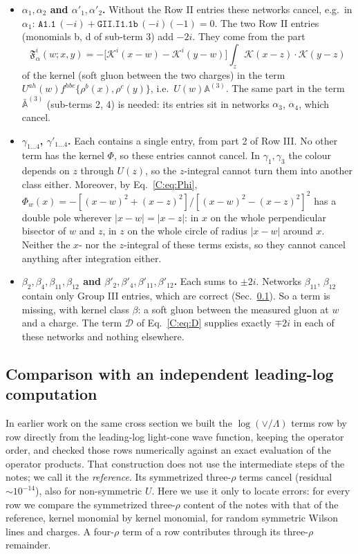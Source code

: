\documentclass[10pt]{article}
\numberwithin{equation}{section}
\newcommand{\KK}{\mathcal K}
\newcommand{\lab}[1]{\texttt{#1}}
\begin{document}
\begin{itemize}
\item \textbf{$\alpha_1,\alpha_2$ and $\alpha'_1,\alpha'_2$.} Without the Row II entries these networks cancel, e.g.\ in $\alpha_1$: $\lab{A1.1}\,(-i)+\lab{GII.I1.1b}\,(-i)(-1)=0$. The two Row II entries (monomials b, d of sub-term 3) add $-2i$. They come from the part
\begin{equation}
\mathfrak F^i_\alpha(w;x,y)=-\big[\KK^i(x-w)-\KK^i(y-w)\big]\int_z\KK(x-z)\cdot\KK(y-z)
\label{C:eq:Falpha}
\end{equation}
of the kernel (soft gluon between the two charges) in the term $U^{ah}(w)f^{hbc}\{\rho^b(x),\rho^c(y)\}$, i.e.\ $U(w)\mathbb A^{(3)}$. The same part in the term $\bar{\mathbb A}^{(3)}$ (sub-terms 2, 4) is needed: its entries sit in networks $\alpha_3$, $\alpha_4$, which cancel.
\item \textbf{$\gamma_{1\ldots4}$, $\gamma'_{1\ldots4}$.} Each contains a single entry, from part 2 of Row III. No other term has the kernel $\Phi$, so these entries cannot cancel. In $\gamma_1,\gamma_3$ the colour depends on $z$ through $U(z)$, so the $z$-integral cannot turn them into another class either. Moreover, by Eq.~\eqref{C:eq:Phi}, $\Phi_w(x)=-[(x-w)^2+(x-z)^2]/[(x-w)^2-(x-z)^2]^2$ has a double pole wherever $|x-w|=|x-z|$: in $x$ on the whole perpendicular bisector of $w$ and $z$, in $z$ on the whole circle of radius $|x-w|$ around $x$. Neither the $x$- nor the $z$-integral of these terms exists, so they cannot cancel anything after integration either.
\item \textbf{$\beta_2,\beta_4,\beta_{11},\beta_{12}$ and $\beta'_2,\beta'_4,\beta'_{11},\beta'_{12}$.} Each sums to $\pm2i$. Networks $\beta_{11}$, $\beta_{12}$ contain only Group III entries, which are correct (Sec.~\ref{C:sec:reference}). So a term is missing, with kernel class $\beta$: a soft gluon between the measured gluon at $w$ and a charge. The term $\mathcal D$ of Eq.~\eqref{C:eq:D} supplies exactly $\mp2i$ in each of these networks and nothing elsewhere.
\end{itemize}

\subsection{Comparison with an independent leading-log computation}\label{C:sec:reference}
In earlier work on the same cross section we built the $\log(\vee/\Lambda)$ terms row by row directly from the leading-log light-cone wave function, keeping the operator order, and checked those rows numerically against an exact evaluation of the operator products. That construction does not use the intermediate steps of the notes; we call it the \emph{reference}. Its symmetrized three-$\rho$ terms cancel (residual $\sim10^{-14}$), also for non-symmetric $U$. Here we use it only to locate errors: for every row we compare the symmetrized three-$\rho$ content of the notes with that of the reference, kernel monomial by kernel monomial, for random symmetric Wilson lines and charges. A four-$\rho$ term of a row contributes through its three-$\rho$ remainder.
\end{document}
